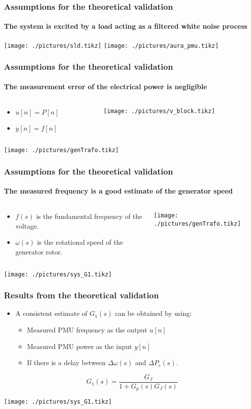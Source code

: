 \begin{frame}
	\frametitle{Assumptions for the theoretical validation}
	\framesubtitle{The system is excited by a load acting as a filtered white noise process}
	\texttt{[image: ./pictures/sld.tikz]}
	\texttt{[image: ./pictures/aura\_pmu.tikz]}
\end{frame}
\begin{frame}
	\frametitle{Assumptions for the theoretical validation}
	\framesubtitle{The measurement error of the electrical power is negligible}
	\begin{columns}
		\begin{column}{0.5\textwidth}
			\begin{itemize}
				\item $u[n] = P[n]$
				\item $y[n] = f[n]$
			\end{itemize}
		\end{column}
		\begin{column}{0.5\textwidth}
			\texttt{[image: ./pictures/v\_block.tikz]}
		\end{column}
	\end{columns}
	\texttt{[image: ./pictures/genTrafo.tikz]}
\end{frame}
\begin{frame}
	\frametitle{Assumptions for the theoretical validation}
	\framesubtitle{The measured frequency is a good estimate of the generator speed}
	\begin{columns}
		\begin{column}{0.35\textwidth}
			\begin{itemize}
				\item $f(s)$ is the fundamental frequency of the voltage.
				\item $\omega(s)$ is the rotational speed of the generator rotor.
			\end{itemize}
		\end{column}
		\begin{column}{0.65\textwidth}
				\texttt{[image: ./pictures/genTrafo.tikz]}
		\end{column}
	\end{columns}
	\texttt{[image: ./pictures/sys\_G1.tikz]}
\end{frame}
\begin{frame}
	\frametitle{Results from the theoretical validation}
	\begin{itemize}
		\item A consistent estimate of $G_1(s)$ can be obtained by using:
		\begin{itemize}
			\item Measured PMU frequency as the output $u[n]$
			\item Measured PMU power as the input $y[n]$
			\item If there is a delay between $\Delta \omega(s)$ and $\Delta P_e(s)$.
		\end{itemize}
		\begin{equation*}
			G_1(s) = \frac{G_{J}}{1+G_p(s)G_J(s)}
		\end{equation*}
	\end{itemize}
	\texttt{[image: ./pictures/sys\_G1.tikz]}
\end{frame}
